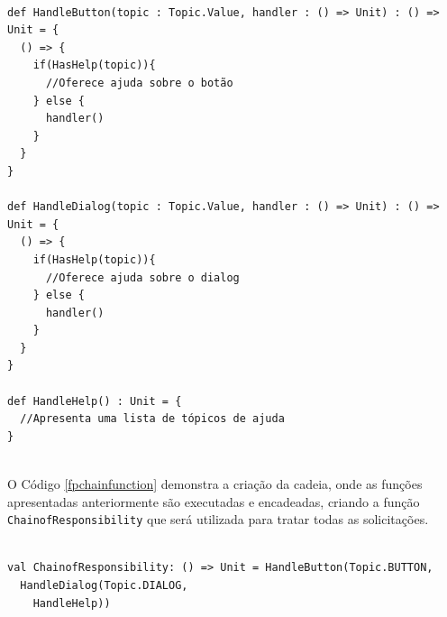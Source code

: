 \begin{lstlisting}[caption={\textit{Chain of Responsibility} Funcional.},label=fpchresponsibility]
    
def HandleButton(topic : Topic.Value, handler : () => Unit) : () => Unit = {
  () => {
    if(HasHelp(topic)){
      //Oferece ajuda sobre o botão
    } else {
      handler()
    }
  }
}

def HandleDialog(topic : Topic.Value, handler : () => Unit) : () => Unit = {
  () => {
    if(HasHelp(topic)){
      //Oferece ajuda sobre o dialog
    } else {
      handler()
    }
  }
}

def HandleHelp() : Unit = {
  //Apresenta uma lista de tópicos de ajuda
}
    
\end{lstlisting}

O Código \ref{fpchainfunction} demonstra a criação 
da cadeia, onde as funções apresentadas anteriormente 
são executadas e encadeadas, criando a função 
\texttt{ChainofResponsibility} que será utilizada para 
tratar todas as solicitações.

\begin{lstlisting}[caption={Função \textit{Chain of Responsability}.},label=fpchainfunction]
    
val ChainofResponsibility: () => Unit = HandleButton(Topic.BUTTON,
  HandleDialog(Topic.DIALOG,
    HandleHelp))
      
\end{lstlisting}
